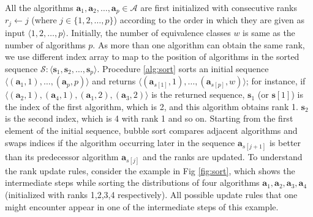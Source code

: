 \documentclass[conference]{IEEEtran}
\newcommand{\p}[1]{{\color{blue} Pdj: #1}}
\begin{document}
All the algorithms $\mathbf{a}_1, \mathbf{a}_2, \dots, \mathbf{a}_p \in \mathcal{A}$ are first initialized with consecutive
ranks $r_j \leftarrow j$ (where $j \in\{1,2,\dots,p\}$) according to the order in which they are given as input $\langle 1,2,\dots,p \rangle
$.
Initially, the number of equivalence classes $w$ is same as the number of algorithms $p$. As more than one algorithm
can obtain the same rank, we use different index array to map to the position of algorithms in the sorted sequence
$\mathcal{S} : \langle \mathbf{s}_1, \mathbf{s}_2, \dots, \mathbf{s}_p \rangle$. 
Procedure \ref{alg:sort} sorts an initial sequence $\langle (\mathbf{a}_1,1), \dots, (\mathbf{a}_p,p) \rangle$ and returns $\langle (\mathbf{a}_{s[1]},1), \dots, (\mathbf{a}_{s[p]},w) \rangle$; for instance, if $\langle (\mathbf{a}_{2},1), (\mathbf{a}_{4},1) , (\mathbf{a}_{1},2), (\mathbf{a}_{3},2) \rangle$ is the returned sequence, $\mathbf{s}_1$ (or $\mathbf{s}[1]$) is the index of the first algorithm, which is 2, and this algorithm obtains rank 1. $\mathbf{s}_2$ is the second index, which is 4 with rank 1 and so on.
 Starting from the first element of the initial sequence,  bubble sort\cite{bubblesort} compares adjacent algorithms and swaps
 indices if the algorithm occurring later in the sequence $\mathbf{a}_{s[j+1]}$ is better than its predecessor algorithm
 $\mathbf{a}_{s[j]}$ and the ranks are updated. To understand the rank update rules, consider the example in Fig
 \ref{fig:sort}, which shows the intermediate steps while sorting the distributions of four algorithms $\mathbf{a}_1,
 \mathbf{a}_2, \mathbf{a}_3,\mathbf{a}_4$ (initialized with ranks 1,2,3,4 respectively). All possible update rules that
 one might encounter appear in one of the intermediate steps of this example.
\end{document}
